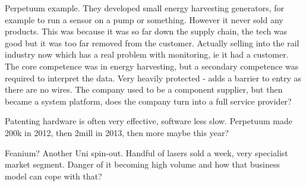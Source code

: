 Perpetuum example. They developed small energy harvesting generators, for example to run a sensor on a pump or something. However it never sold any products. This was because it was so far down the supply chain, the tech was good but it was too far removed from the customer. Actually selling into the rail industry now which has a real problem with monitoring, ie it had a customer. The core competence was in energy harvesting, but a secondary competence was required to interpret the data. Very heavily protected - adds a barrier to entry as there are no wires. The company used to be a component supplier, but then became a system platform, does the company turn into a full service provider? 

Patenting hardware is often very effective, software less slow. Perpetuum made 200k in 2012, then 2mill in 2013, then more maybe this year?

Feanium? Another Uni spin-out. Handful of lasers sold a week, very specialist market segment. Danger of it becoming high volume and how that business model can cope with that?



\lipsum[3] 

